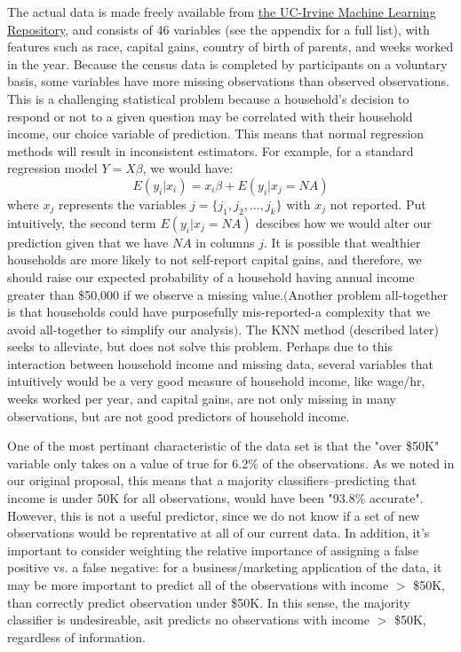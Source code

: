 \documentclass[11pt]{article}
\begin{document}
The actual data is made freely available from 
\href{http://archive.ics.uci.edu/ml/datasets/Census-Income+%28KDD%29}{the UC-Irvine Machine Learning Repository}, and consists of 46 variables (see the appendix for a full list), with features such as race, capital gains, country of birth of parents, and weeks worked in the year. Because the census data is completed by participants on a voluntary basis, some variables have more missing observations than observed observations.  This is a challenging statistical problem because a household's decision to respond or not to a given question may be correlated with their household income, our choice variable of prediction. This means that normal regression methods will result in inconsistent estimators. For example, for a standard regression model $Y = X\beta$, we would have: 
\begin{equation}
E(y_i|x_i) = x_i \beta + E(y_i | x_j = NA)
\end{equation}
where $x_j$ represents the variables $j = \{j_1, j_2,...,j_k\}$ with $x_j$ not reported. Put intuitively, the second term $E(y_i | x_j = NA)$ descibes how we would alter our prediction given that we have $NA$ in columns $j$. It is possible that wealthier households are more likely to not self-report capital gains, and therefore, we should raise our expected probability of a household having annual income greater than \$50,000 if we observe a missing value.$($Another problem all-together is that households could have purposefully mis-reported-a complexity that we avoid all-together to simplify our analysis$)$. The KNN method (described later) seeks to alleviate, but does not solve this problem. Perhaps due to this interaction between household income and missing data, several variables that intuitively would be a very good measure of household income, like wage/hr, weeks worked per year, and capital gains, are not only missing in many observations, but are not good predictors of household income. 

One of the most pertinant characteristic of the data set is that the "over \$50K" variable only takes on a value of true for 6.2\% of the observations. As we noted in our original proposal, this means that a majority classifiers--predicting that income is under 50K for all observations, would have been "93.8\% accurate". However, this is not a useful predictor, since we do not know if a set of new observations would be reprentative at all of our current data. In addition, it's important to consider weighting the relative importance of assigning a false positive vs. a false negative: for a business/marketing application of the data, it may be more important to predict all of the observations with income $>$ \$50K, than correctly predict observation under \$50K. In this sense, the majority classifier is undesireable, asit predicts no observations with income $>$ \$50K, regardless of information.
\end{document}
